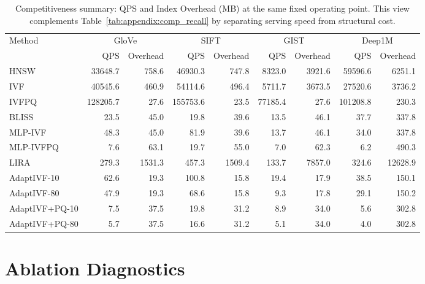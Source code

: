 \documentclass[sigconf]{acmart}
\begin{document}
\begin{table}[!htbp]
  \centering
  \scriptsize
  \setlength{\tabcolsep}{3pt}
  \caption{Competitiveness summary: QPS and Index Overhead (MB) at the same fixed operating point. This view complements Table~\ref{tab:appendix:comp_recall} by separating serving speed from structural cost.}
  \label{tab:appendix:comp_systems}
  \begin{tabular}{lrrrrrrrr}
    \toprule
    Method & \multicolumn{2}{c}{GloVe} & \multicolumn{2}{c}{SIFT} & \multicolumn{2}{c}{GIST} & \multicolumn{2}{c}{Deep1M} \\
    \cmidrule(lr){2-3}\cmidrule(lr){4-5}\cmidrule(lr){6-7}\cmidrule(lr){8-9}
    & QPS & Overhead & QPS & Overhead & QPS & Overhead & QPS & Overhead \\
    \midrule
    HNSW & 33648.7 & 758.6 & 46930.3 & 747.8 & 8323.0 & 3921.6 & 59596.6 & 6251.1 \\
    IVF & 40545.6 & 460.9 & 54114.6 & 496.4 & 5711.7 & 3673.5 & 27520.6 & 3736.2 \\
    IVFPQ & 128205.7 & 27.6 & 155753.6 & 23.5 & 77185.4 & 27.6 & 101208.8 & 230.3 \\
    BLISS & 23.5 & 45.0 & 19.8 & 39.6 & 13.5 & 46.1 & 37.7 & 337.8 \\
    MLP-IVF & 48.3 & 45.0 & 81.9 & 39.6 & 13.7 & 46.1 & 34.0 & 337.8 \\
    MLP-IVFPQ & 7.6 & 63.1 & 19.7 & 55.0 & 7.0 & 62.3 & 6.2 & 490.3 \\
    LIRA & 279.3 & 1531.3 & 457.3 & 1509.4 & 133.7 & 7857.0 & 324.6 & 12628.9 \\
    AdaptIVF-10 & 62.6 & 19.3 & 100.8 & 15.8 & 19.4 & 17.9 & 38.5 & 150.1 \\
    AdaptIVF-80 & 47.9 & 19.3 & 68.6 & 15.8 & 9.3 & 17.8 & 29.1 & 150.2 \\
    AdaptIVF+PQ-10 & 7.5 & 37.5 & 19.8 & 31.2 & 8.9 & 34.0 & 5.6 & 302.8 \\
    AdaptIVF+PQ-80 & 5.7 & 37.5 & 16.6 & 31.2 & 5.1 & 34.0 & 4.0 & 302.8 \\
    \bottomrule
  \end{tabular}
\end{table}

\section{Ablation Diagnostics}
\end{document}

